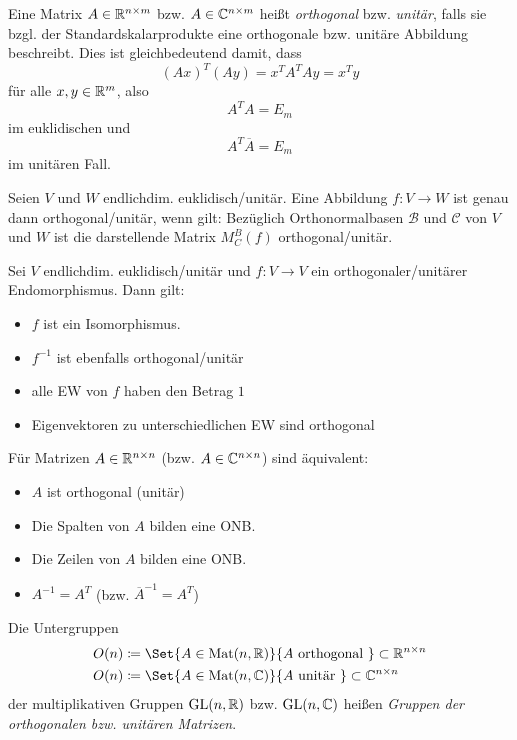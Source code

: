 \documentclass{cheat-sheet}
\newcommand{\GL}{\mathrm{GL}}
\newcommand{\Mat}{\mathrm{Mat}}
\newcommand{\BB}{\mathcal{B}}
\newcommand{\BC}{\mathcal{C}}
\begin{document}
\begin{defn}
Eine Matrix $A \in \mathbb{R}^{n \times m}$ bzw. $A \in \mathbb{C}^{n \times m}$ heißt \emph{orthogonal} bzw. \emph{unitär}, falls sie bzgl. der Standardskalarprodukte eine orthogonale bzw. unitäre Abbildung beschreibt. Dies ist gleichbedeutend damit, dass
\[ (Ax)^T (Ay) = x^T A^T Ay = x^T y \]
für alle $x, y \in \mathbb{R}^m$, also
\[ A^T A = E_m \]
im euklidischen und
\[ A^T \overline{A} = E_m \]
im unitären Fall.
\end{defn}

\begin{satz}
Seien $V$ und $W$ endlichdim. euklidisch/unitär. Eine Abbildung $f : V \to W$ ist genau dann orthogonal/unitär, wenn gilt: Bezüglich Orthonormalbasen $\BB$ und $\BC$ von $V$ und $W$ ist die darstellende Matrix $M_C^B(f)$ orthogonal/unitär.
\end{satz}

\begin{satz}
Sei $V$ endlichdim. euklidisch/unitär und $f : V \to V$ ein orthogonaler/unitärer Endomorphismus. Dann gilt:
\begin{itemize}
  \item $f$ ist ein Isomorphismus.
  \item $f^{-1}$ ist ebenfalls orthogonal/unitär
  \item alle EW von $f$ haben den Betrag $1$
  \item Eigenvektoren zu unterschiedlichen EW sind orthogonal
\end{itemize}
\end{satz}

\begin{bem}
Für Matrizen $A \in \mathbb{R}^{n \times n}$ (bzw. $A \in \mathbb{C}^{n \times n}$) sind äquivalent:
\begin{itemize}
  \item $A$ ist orthogonal (unitär)
  \item Die Spalten von $A$ bilden eine ONB.
  \item Die Zeilen von $A$ bilden eine ONB.
  \item $A^{-1} = A^T$ (bzw. $\overline{A}^{-1} = A^T$)
\end{itemize}
\end{bem}

\begin{defn}
Die Untergruppen
\begin{align*}
O(n) &\coloneqq \Set{ A \in \Mat(n, \R) }{ A \text{ orthogonal } } \subset \R^{n \times n} \\
O(n) &\coloneqq \Set{ A \in \Mat(n, \C) }{ A \text{ unitär } } \subset \C^{n \times n} \\
\end{align*}
der multiplikativen Gruppen $\GL(n, \R)$ bzw. $\GL(n, \C)$ heißen \emph{Gruppen der orthogonalen bzw. unitären Matrizen}.
\end{defn}
\end{document}
